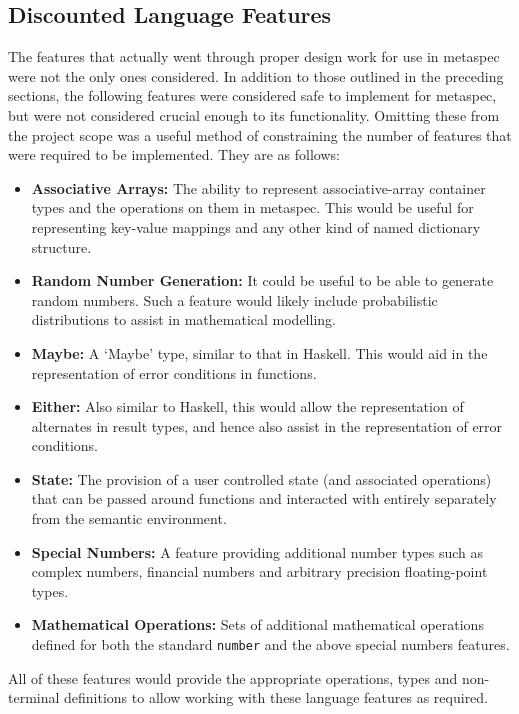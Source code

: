 
\subsection{Discounted Language Features} %
\label{sub:discounted_language_features}
The features that actually went through proper design work for use in \gls{metaspec} were not the only ones considered. 
In addition to those outlined in the preceding sections, the following features were considered safe to implement for \gls{metaspec}, but were not considered crucial enough to its functionality.
Omitting these from the project scope was a useful method of constraining the number of features that were required to be implemented.
They are as follows:
\begin{itemize}
    \item \textbf{Associative Arrays:} The ability to represent associative-array container types and the operations on them in metaspec. 
    This would be useful for representing key-value mappings and any other kind of named dictionary structure.
    \item \textbf{Random Number Generation:} It could be useful to be able to generate random numbers.
    Such a feature would likely include probabilistic distributions to assist in mathematical modelling.
    \item \textbf{Maybe:} A `Maybe' type, similar to that in Haskell.
    This would aid in the representation of error conditions in functions.
    \item \textbf{Either:} Also similar to Haskell, this would allow the representation of alternates in result types, and hence also assist in the representation of error conditions.
    \item \textbf{State:} The provision of a user controlled state (and associated operations) that can be passed around functions and interacted with entirely separately from the semantic environment.
    \item \textbf{Special Numbers:} A feature providing additional number types such as complex numbers, financial numbers and arbitrary precision floating-point types.
    \item \textbf{Mathematical Operations:} Sets of additional mathematical operations defined for both the standard \texttt{number} and the above special numbers features. 
\end{itemize}

All of these features would provide the appropriate operations, types and non-terminal definitions to allow working with these language features as required. 



